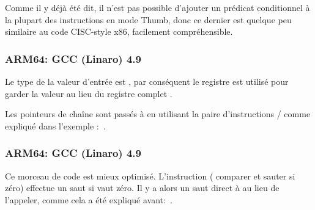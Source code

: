 
Comme il y déjà été dit, il n'est pas possible d'ajouter un prédicat conditionnel
à la plupart des instructions en mode Thumb, donc ce dernier est quelque peu similaire
au code \ac{CISC}-style x86, facilement compréhensible.

\subsubsection{ARM64: GCC (Linaro) 4.9 \NonOptimizing}



Le type de la valeur d'entrée est \Tint, par conséquent le registre  est
utilisé pour garder la valeur au lieu du registre complet .

Les pointeurs de chaîne sont passés à \puts en utilisant la paire d'instructions
/ comme expliqué dans l'exemple \q{\HelloWorldSectionName}:~.

\subsubsection{ARM64: GCC (Linaro) 4.9 \Optimizing}



Ce morceau de code est mieux optimisé.
L'instruction  ( comparer et sauter si zéro)
effectue un saut si  vaut zéro.
Il y a alors un saut direct à \puts au lieu de l'appeler, comme cela a été expliqué
avant:~.

